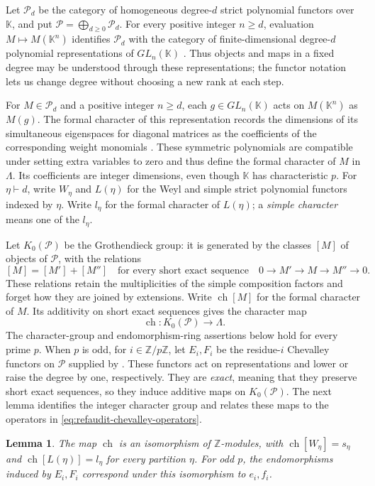 \documentclass[12pt,reqno,a4paper]{amsart}
\numberwithin{equation}{section}
\numberwithin{figure}{section}
\theoremstyle{plain}
\newtheorem{lemma}[theorem]{Lemma}
\theoremstyle{definition}
\newcommand{\cP}{\mathcal P}
\DeclareMathOperator{\ch}{ch}
\begin{document}
Let $\cP_d$ be the category of homogeneous degree-$d$ strict polynomial functors
over $\mathbb K$, and put
$\cP=\bigoplus_{d\geq0}\cP_d$.  For every positive integer $n\geq d$,
evaluation $M\mapsto M(\mathbb K^n)$ identifies $\cP_d$ with the
category of finite-dimensional degree-$d$ polynomial representations
of $GL_n(\mathbb K)$
\cite[Lemma~3.4]{FriedlanderSuslin}.  Thus objects and maps
in a fixed degree may be understood through these representations;
the functor notation lets us change degree without choosing a new
rank at each step.

For $M\in\cP_d$ and a positive integer $n\geq d$, each
$g\in GL_n(\mathbb K)$ acts on $M(\mathbb K^n)$ as $M(g)$.
The formal character of this representation records the dimensions
of its simultaneous eigenspaces for diagonal matrices as the
coefficients of the corresponding weight monomials
\cite[Sections~3.2 and~3.4]{Green}.  These symmetric
polynomials are compatible under setting extra variables to zero
and thus define the formal character of $M$ in $\Lambda$.
Its coefficients are integer dimensions, even though $\mathbb K$
has characteristic $p$.  For $\eta\vdash d$, write $W_\eta$ and $L(\eta)$
for the Weyl and simple strict polynomial functors indexed by $\eta$.
Write $l_\eta$ for the formal character
of $L(\eta)$; a \emph{simple character} means one of the $l_\eta$.

Let $K_0(\cP)$ be the Grothendieck group: it is generated by the
classes $[M]$ of objects of $\cP$, with the relations
\[
[M]=[M']+[M'']
\quad\text{for every short exact sequence}\quad
0\longrightarrow M'\longrightarrow M\longrightarrow M''
\longrightarrow0.
\]
These relations retain the multiplicities of the simple composition
factors and forget how they are joined by extensions.  Write
$\ch[M]$ for the formal character of $M$.  Its additivity on
short exact sequences gives the character map
\[
\ch:K_0(\cP)\longrightarrow\Lambda.
\]
The character-group and endomorphism-ring assertions below hold for
every prime $p$.  When $p$ is odd, for $i\in\mathbb Z/p\mathbb Z$,
let $E_i,F_i$ be the residue-$i$
Chevalley functors on $\cP$ supplied by \cite[Theorem~4]{HTY}.
These functors act on representations and lower or raise the degree
by one, respectively.  They are \emph{exact}, meaning that they
preserve short exact sequences, so they induce additive maps on
$K_0(\cP)$.  The next lemma identifies the integer character group
and relates these maps to the operators in
\eqref{eq:refaudit-chevalley-operators}.

\begin{lemma}\label{lem:integral-character}
The map $\ch$ is an isomorphism of $\mathbb Z$-modules, with
$\ch[W_\eta]=s_\eta$ and $\ch[L(\eta)]=l_\eta$ for every partition
$\eta$.  For odd $p$, the endomorphisms induced by $E_i,F_i$
correspond under this isomorphism to $e_i,f_i$.
\end{lemma}
\end{document}
